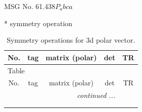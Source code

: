\documentclass[fleqn,8pt]{jsarticle}
\begin{document}
\setcounter{MaxMatrixCols}{32}

\renewcommand{\tablename}{Table~}
\renewcommand{\figurename}{Figure~}
\begin{center}
\LARGE
MSG No. 61.438\quad$P_{a}bca$
\end{center}
* symmetry operation
\renewcommand{\arraystretch}{1.3}
\begin{longtable}{ccccc}
\caption{Symmetry operations for 3d polar vector.}
 \\
 \hline \hline
No. & tag & matrix (polar) & det & TR \\ \hline \endfirsthead

\multicolumn{4}{l}{\tablename\ \thetable{}} \\
 \hline \hline
No. & tag & matrix (polar) & det & TR \\ \hline \endhead

 \hline \hline
\multicolumn{4}{r}{\footnotesize\it continued ...} \\ \endfoot

 \hline \hline
\multicolumn{4}{r}{} \\ \endlastfoot


\end{longtable}
\end{document}
